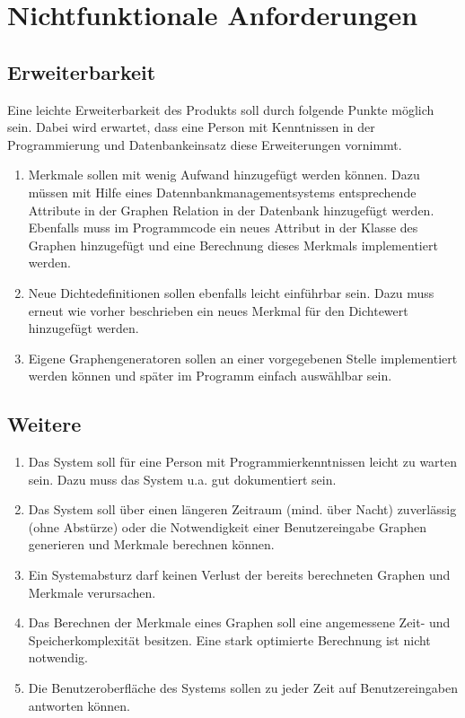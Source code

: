 \documentclass[13pt]{scrreprt}
\begin{document}
\chapter{Nichtfunktionale Anforderungen}

\section{Erweiterbarkeit}
Eine leichte Erweiterbarkeit des Produkts soll durch folgende Punkte möglich sein. Dabei wird erwartet, dass eine Person mit Kenntnissen in der Programmierung und Datenbankeinsatz diese Erweiterungen vornimmt.
\\
\begin{addmargin}[25pt]{0pt}
\begin{enumerate} [label=NF\arabic*00,start=1]	
	\item Merkmale sollen mit wenig Aufwand hinzugefügt werden können. Dazu müssen mit Hilfe eines Datennbankmanagementsystems entsprechende  Attribute in der Graphen Relation in der Datenbank hinzugefügt werden. Ebenfalls muss im Programmcode ein neues Attribut in der Klasse des Graphen hinzugefügt und eine Berechnung dieses Merkmals implementiert werden.
	\item Neue Dichtedefinitionen sollen ebenfalls leicht einführbar sein. Dazu muss erneut wie vorher beschrieben ein neues Merkmal für den Dichtewert hinzugefügt werden.
	\item Eigene Graphengeneratoren sollen an einer vorgegebenen Stelle implementiert werden können und später im Programm einfach auswählbar sein.
\end{enumerate}
\end{addmargin}

\section{Weitere}
\begin{addmargin}[25pt]{0pt}
\begin{enumerate} [label=NF\arabic*00,start=4]
        \item Das System soll für eine Person mit Programmierkenntnissen leicht zu warten sein. Dazu muss das System u.a. gut dokumentiert sein.
        \item Das System soll über einen längeren Zeitraum (mind. über Nacht) zuverlässig (ohne Abstürze) oder die Notwendigkeit einer Benutzereingabe Graphen generieren und Merkmale berechnen können.
        \item Ein Systemabsturz darf keinen Verlust der bereits berechneten Graphen und Merkmale verursachen.
        \item Das Berechnen der Merkmale eines Graphen soll eine angemessene Zeit- und Speicherkomplexität besitzen. Eine stark optimierte Berechnung ist nicht notwendig.
        \item Die Benutzeroberfläche des Systems sollen zu jeder Zeit auf Benutzereingaben antworten können.
\end{enumerate}
\end{addmargin}
\end{document}
